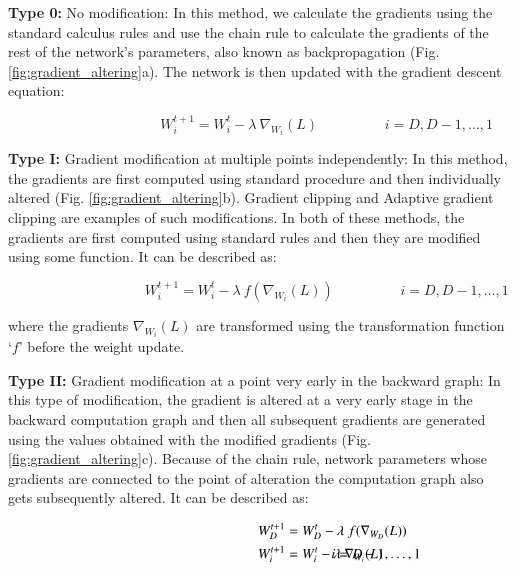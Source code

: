\documentclass[times,sort&compress]{elsarticle}
\begin{document}
\textbf{Type 0:} No modification: In this method, we calculate the gradients using the
standard calculus rules and use the chain rule to calculate the gradients of the rest of
the network's parameters, also known as backpropagation (Fig.
\ref{fig:gradient_altering}a). The network is then updated with the gradient descent
equation:

\begin{equation}
\hspace{4cm}
W_i^{t+1} = W_i^t - \lambda\ \nabla_{W_i}(L)
\hspace{2cm}
i=D,D-1,\ldots,1
\end{equation}

\textbf{Type I:} Gradient modification at multiple points independently: In this method,
the gradients are first computed using standard procedure and then individually altered
(Fig. \ref{fig:gradient_altering}b). Gradient clipping \cite{pascanu2013difficulty} and
Adaptive gradient clipping \cite{brock2021high} are examples of such modifications. In
both of these methods, the gradients are first computed using standard rules and then
they are modified using some function. It can be described as:

\begin{equation}
\hspace{4cm}
W_i^{t+1} = W_i^t - \lambda\ f(\nabla_{W_i}(L))
\hspace{2cm}
i=D,D-1,\ldots,1
\end{equation}

where the gradients $\nabla_{W_i}(L)$ are transformed using the transformation function
`$f$' before the weight update.

\textbf{Type II:} Gradient modification at a point very early in the backward graph: In
this type of modification, the gradient is altered at a very early stage in the backward
computation graph and then all subsequent gradients are generated using the values
obtained with the modified gradients (Fig. \ref{fig:gradient_altering}c). Because of the
chain rule, network parameters whose gradients are connected to the point of alteration
the computation graph also gets subsequently altered. It can be described as:

\begin{align}
\hspace{4cm}
W_D^{t+1} &= W_D^t - \lambda\ f(\nabla_{W_D}(L)) & \\
W_i^{t+1} &= W_i^t - \lambda\ \nabla_{W_i}(L) &\hspace{-3cm} i=D-1,\ldots,1
\end{align}
\end{document}

